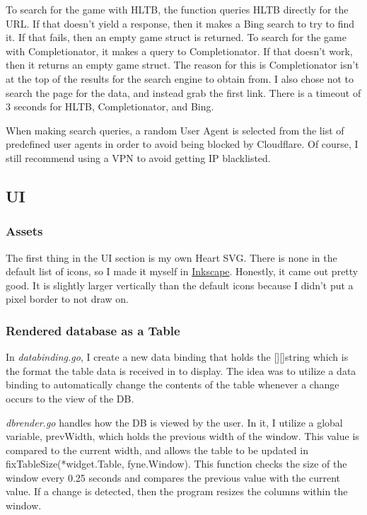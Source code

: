 To search for the game with HLTB, the function queries HLTB directly for
the URL. If that doesn't yield a response, then it makes a Bing
search to try to find it.
If that fails, then an empty game struct is returned. To search
for the game with Completionator, it makes a query to Completionator.
If that doesn't work, then it returns an empty game struct.
The reason for this is Completionator isn't at the top of the
results for the search engine to obtain from. I also chose not to
search the page for the data, and instead grab the first link. There
is a timeout of 3 seconds for HLTB, Completionator, and Bing.

When making search queries, a random User Agent is selected from the
list of predefined user agents in order to avoid being blocked by
Cloudflare. Of course, I still recommend using a VPN to avoid getting
IP blacklisted.

\subsection{UI}
\label{subsec:UI}

\subsubsection{Assets}

The first thing in the UI section is my own Heart SVG. There is none
in the default list of icons, so I made it myself in
\href{https://inkscape.org/}{Inkscape}.
Honestly, it came out pretty good. It is slightly larger vertically
than the default icons because I didn't put a pixel border to not draw on.

\subsubsection{Rendered database as a Table}

In \textit{databinding.go}, I create a new data binding that holds
the [][]string which is the format the table data is received in to
display. The idea was to utilize a data binding to automatically
change the contents of the table whenever a change occurs to the view of the DB.

\textit{dbrender.go} handles how the DB is viewed by the user.
In it, I utilize a global variable, prevWidth, which holds the
previous width of the window. This value is compared to the current
width, and allows the table to be updated in
fixTableSize(*widget.Table, fyne.Window).
This function checks the size of the window every 0.25 seconds and
compares the previous value with the current value. If a change is
detected, then the program resizes the columns within the window.

